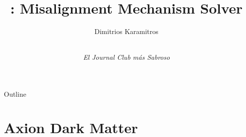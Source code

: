 \documentclass[10pt,utf8,compress,xcolor=dvipsnames]{beamer}
\title[]{\mimes: Misalignment Mechanism Solver}
\author{Dimitrios Karamitros}
\institute{
	Manchester U.\\
\begin{figure}\vspace{-0.0cm}
\end{figure}
}
\date{\bl{23/11/2021}\\{\sl El Journal Club más Sabroso} }
\begin{document}
	
	\begin{frame}
		\titlepage

	\end{frame}

	\begin{frame}{Outline}
	 \fontL \tableofcontents[]
	\end{frame}


\section{Axion Dark Matter}
\end{document}
